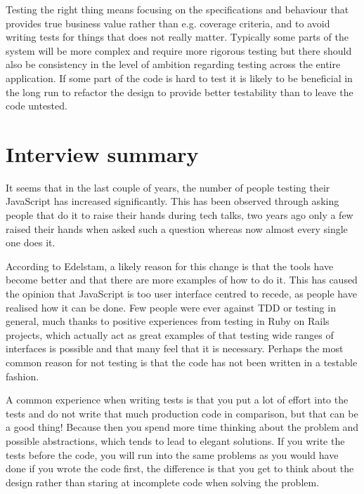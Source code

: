\documentclass[11pt]{article}
\begin{document}
Testing the right thing means focusing on the specifications and behaviour that provides true business value rather than e.g. coverage criteria, and to avoid writing tests for things that does not really matter. Typically some parts of the system will be more complex and require more rigorous testing but there should also be consistency in the level of ambition regarding testing across the entire application. If some part of the code is hard to test it is likely to be beneficial in the long run to refactor the design to provide better testability than to leave the code untested.


\section{Interview summary}

It seems that in the last couple of years, the number of people testing their JavaScript has increased significantly\cite[question~1]{Edelstam}. This has been observed through asking people that do it to raise their hands during tech talks, two years ago only a few raised their hands when asked such a question whereas now almost every single one does it.

According to Edelstam, a likely reason for this change is that the tools have become better and that there are more examples of how to do it. This has caused the opinion that JavaScript is too user interface centred to recede, as people have realised how it can be done. Few people were ever against TDD or testing in general, much thanks to positive experiences from testing in Ruby on Rails projects, which actually act as great examples of that testing wide ranges of interfaces is possible and that many feel that it is necessary. Perhaps the most common reason for not testing is that the code has not been written in a testable fashion. \cite[questions~2-3]{Edelstam}

A common experience when writing tests is that you put a lot of effort into the tests and do not write that much production code in comparison, but that can be a good thing! Because then you spend more time thinking about the problem and possible abstractions, which tends to lead to elegant solutions. If you write the tests before the code, you will run into the same problems as you would have done if you wrote the code first, the difference is that you get to think about the design rather than staring at incomplete code when solving the problem. \cite[question~8]{Edelstam}
\end{document}
